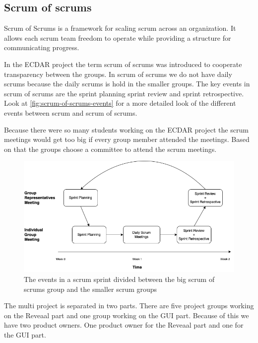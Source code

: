 \subsection{Scrum of scrums}
Scrum of Scrums is a framework for scaling scrum across an organization. It allows each scrum team freedom to operate while providing a structure for communicating progress. 

In the ECDAR project the term scrum of scrums was introduced to cooperate transparency between the groups.
In scrum of scrums we do not have daily scrums because the daily scrums is hold in the smaller groups.
The key events in scrum of scrums are the sprint planning sprint review and sprint retrospective.
Look at \autoref{fig:scrum-of-scrums-events} for a more detailed look of the different events between scrum and scrum of scrums.


Because there were so many students working on the ECDAR project the scrum meetings would get too big if every group member attended the meetings.
Based on that the groups choose a committee to attend the scrum meetings.

\begin{figure}[H]
    \centering
    \includegraphics[width=\textwidth]{common/figures/Scrum_of_scrums_schedule.png}
    \caption{The events in a scrum sprint divided between the big scrum of scrums group and the smaller scrum groups}
    \label{fig:scrum-of-scrums-events}
\end{figure}


The multi project is separated in two parts. 
There are five project groups working on the Reveaal part and one group working on the GUI part.
Because of this we have two product owners.
One product owner for the Reveaal part and one for the GUI part.


